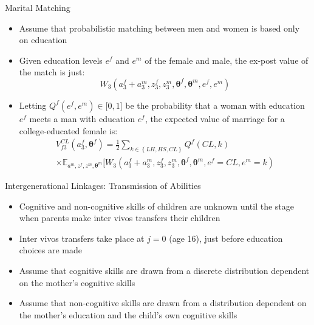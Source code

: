 \documentclass{beamer}
\begin{document}
\begin{frame}{Marital Matching}
\begin{itemize}
  \item Assume that probabilistic matching between men and women is based only on education
  \item Given education levels $e^f$ and $e^m$ of the female and male, the ex-post value of 		   		   the match is just:
  		$$W_3(a^f_3+a^m_3,z^f_3,z^m_3,\boldsymbol{\theta}^f,\boldsymbol{\theta}^m,e^f,e^m)$$
  \item Letting $Q^f(e^f,e^m)\in\big[0,1]$ be the probability that a woman with education $e^f$ meets a 		man with education $e^f$, the expected value of marriage for a college-educated female is:
  		\begin{equation*}
  		\begin{aligned}
		V^{CL}_{f3}(a^f_3,\boldsymbol{\theta}^f)=\frac{1}{2}\underset{k\in\left\{LH,HS,CL\right					\}}{\sum}Q^f(CL,k) \\
        \times\mathbb{E}_{a^m,z^f,z^m,\boldsymbol{\theta}^m}\big[W_3(a^f_3+a^m_3,z^f_3,z^m_3,					\boldsymbol{\theta}^f,\boldsymbol{\theta}^m,e^f=CL,e^m=k)
        \end{aligned}
        \end{equation*}
\end{itemize}      
\end{frame} 

\begin{frame}{Intergenerational Linkages: Transmission of Abilities}
\begin{itemize}
  \item Cognitive and non-cognitive skills of children are unknown until the stage when parents make 			inter vivos transfers their children
  \item Inter vivos transfers take place at $j=0$ (age 16), just before education choices are made
  \item Assume that cognitive skills are drawn from a discrete distribution dependent on the mother's 			cognitive skills
  \item Assume that non-cognitive skills are drawn from a distribution dependent on the mother's 				education and the child's own cognitive skills
\end{itemize}      
\end{frame} 
\end{document}
